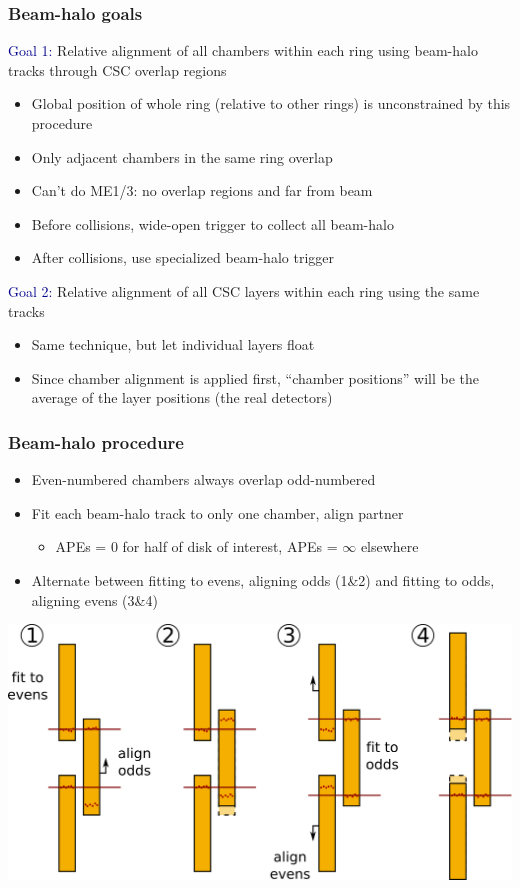 \documentclass[compress]{beamer}
\begin{document}
\begin{frame}
\frametitle{Beam-halo goals}
\textcolor{darkblue}{Goal 1:} Relative alignment of all chambers
within each ring using beam-halo tracks through CSC overlap regions
\begin{itemize}
\item Global position of whole ring (relative to other rings) is unconstrained by this procedure
\item Only adjacent chambers in the same ring overlap
\item Can't do ME1/3: no overlap regions and far from beam
\item Before collisions, wide-open trigger to collect all beam-halo
\item After collisions, use specialized beam-halo trigger
\end{itemize}

\textcolor{darkblue}{Goal 2:} Relative alignment of all CSC layers
within each ring using the same tracks
\begin{itemize}
\item Same technique, but let individual layers float
\item Since chamber alignment is applied first, ``chamber positions''
will be the average of the layer positions (the real detectors)
\end{itemize}
\end{frame}

\begin{frame}
\frametitle{Beam-halo procedure}
\begin{itemize}
\item Even-numbered chambers always overlap odd-numbered
\item Fit each beam-halo track to only one chamber, align partner
\begin{itemize}
\item APEs = 0 for half of disk of interest, APEs = $\infty$ elsewhere
\end{itemize}
\item Alternate between fitting to evens, aligning odds (1\&2) and
fitting to odds, aligning evens (3\&4)
\end{itemize}

\begin{center}
\includegraphics[width=0.75\linewidth]{beamhalo.png}
\end{center}
\end{frame}
\end{document}

